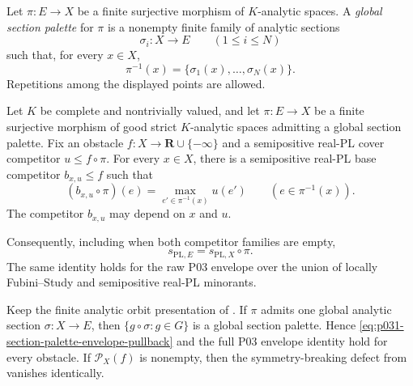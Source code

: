 
\begin{definition}
\label{def:p031-global-section-palette}
Let $\pi:E\to X$ be a finite surjective morphism of $K$-analytic spaces.
A \emph{global section palette} for $\pi$ is a nonempty finite family of
analytic sections
\[
                 \sigma_i:X\longrightarrow E
                    \qquad(1\leq i\leq N)
\]
such that, for every $x\in X$,
\begin{equation}
\label{eq:p031-global-section-palette}
             \pi^{-1}(x)
                =\{\sigma_1(x),\ldots,\sigma_N(x)\}.
\end{equation}
Repetitions among the displayed points are allowed.
\end{definition}

\begin{theorem}
\label{thm:p031-section-palette-envelope-descent}
Let $K$ be complete and nontrivially valued, and let $\pi:E\to X$ be a
finite surjective morphism of good strict $K$-analytic spaces admitting a
global section palette.  Fix an obstacle
$f:X\to\mathbf R\cup\{-\infty\}$ and a semipositive real-PL cover
competitor $u\leq f\circ\pi$.  For every $x\in X$, there is a semipositive
real-PL base competitor $b_{x,u}\leq f$ such that
\begin{equation}
\label{eq:p031-section-palette-exact-repair}
 (b_{x,u}\circ\pi)(e)
   =\max_{e'\in\pi^{-1}(x)}u(e')
       \qquad(e\in\pi^{-1}(x)).
\end{equation}
The competitor $b_{x,u}$ may depend on $x$ and $u$.

Consequently, including when both competitor families are empty,
\begin{equation}
\label{eq:p031-section-palette-envelope-pullback}
                 s_{\mathrm{PL},E}
                    =s_{\mathrm{PL},X}\circ\pi.
\end{equation}
The same identity holds for the raw P03 envelope over the union of locally
Fubini--Study and semipositive real-PL minorants.
\end{theorem}

\begin{corollary}
\label{cor:p031-sectioned-orbit-defect-vanishing}
Keep the finite analytic orbit presentation of
.  If $\pi$ admits one
global analytic section $\sigma:X\to E$, then
$\{g\circ\sigma:g\in G\}$ is a global section palette.  Hence
\eqref{eq:p031-section-palette-envelope-pullback} and the full P03 envelope
identity hold for every obstacle.  If $\mathcal P_X(f)$ is nonempty, then
the symmetry-breaking defect from
 vanishes identically.
\end{corollary}


